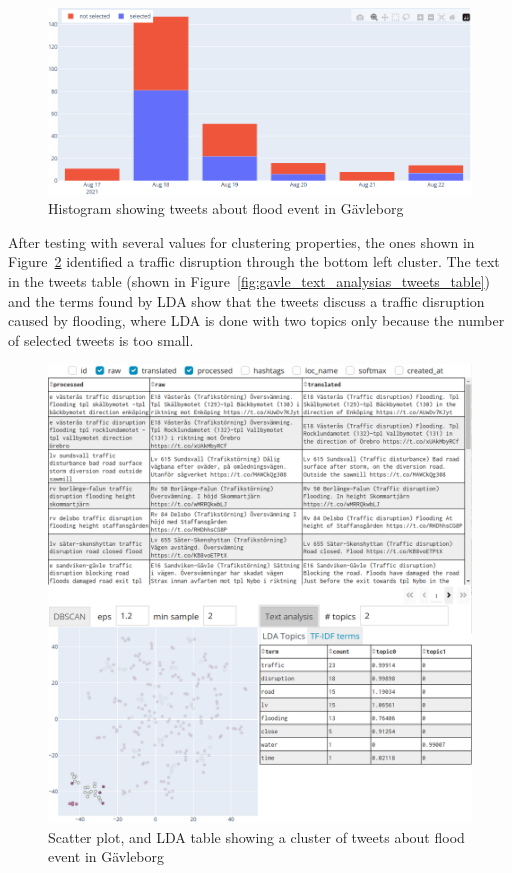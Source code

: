 \begin{figure}[H]
  \begin{center}
    \includegraphics[width=12cm]{./images/gavle_histogram.png}
  \end{center}
  \caption{Histogram showing tweets about flood event in Gävleborg}
  \label{fig:gavle_histogram}
\end{figure}


After testing with several values for clustering properties, the ones shown in
Figure~\ref{fig:gavle_text_analysis_scatter_tables} identified a traffic disruption through the
bottom left cluster. The text in the tweets table (shown in
Figure~\ref{fig:gavle_text_analysias_tweets_table}) and the terms found by \ac{LDA} show that the
tweets discuss a traffic disruption caused by flooding, where \ac{LDA} is done with two topics only
because the number of selected tweets is too small.

\begin{figure}[H]
  \begin{center}
    \includegraphics[width=\columnwidth, trim={0cm 0cm 0cm 14.5cm},clip]{./images/gavle_text_analysis.png}
  \end{center}
  \caption{Scatter plot, and \ac{LDA} table showing a cluster of tweets about flood event in Gävleborg}
  \label{fig:gavle_text_analysis_scatter_tables}
\end{figure}

